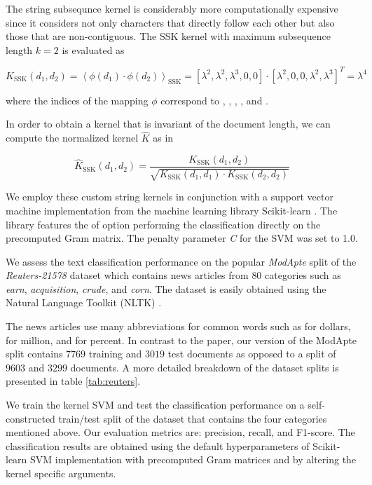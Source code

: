 
The string subsequnce kernel is considerably more computationally expensive since it considers not only characters that directly follow each other but also those that are non-contiguous. The SSK kernel with maximum subsequence length $k = 2$ is evaluated as

\begin{equation} \label{eq:ssk}
  K_\text{SSK}(d_1, d_2) = \left\langle \phi(d_1) \cdot \phi(d_2) \right\rangle_\text{SSK} = [\lambda^2, \lambda^2, \lambda^3, 0, 0] \cdot [\lambda^2, 0, 0, \lambda^2, \lambda^3]^T = \lambda^4
\end{equation}

where the indices of the mapping $\phi$ correspond to , , , , and .

In order to obtain a kernel that is invariant of the document length, we can compute the normalized kernel $\hat{K}$ as in

\begin{equation}
  \hat{K}_\text{SSK}(d_1, d_2) = \frac{K_\text{SSK}(d_1, d_2)}{\sqrt{K_\text{SSK}(d_1, d_1) \cdot K_\text{SSK}(d_2, d_2)}}
\end{equation}



We employ these custom string kernels in conjunction with a support vector machine implementation from the machine learning library Scikit-learn \cite{sklearn}. The library features the of option performing the classification directly on the precomputed Gram matrix. The penalty parameter \textit{C} for the SVM was set to 1.0. 

We assess the text classification performance on the popular \textit{ModApte} split of the \textit{Reuters-21578} dataset which contains news articles from $80$ categories such as \textit{earn}, \textit{acquisition}, \textit{crude}, and \textit{corn}. The dataset is easily obtained using the Natural Language Toolkit (NLTK) \cite{nltk}.

The news articles use many abbreviations for common words such as  for dollars,  for million, and  for percent. In contrast to the paper, our version of the ModApte split contains $7769$ training and $3019$ test documents as opposed to a split of $9603$ and $3299$ documents. A more detailed breakdown of the dataset splits is presented in table \ref{tab:reuters}.



We train the kernel SVM and test the classification performance on a self-constructed train/test split of the dataset that contains the four categories mentioned above. Our evaluation metrics are: precision, recall, and F1-score. The classification results are obtained using the default hyperparameters of Scikit-learn SVM implementation with precomputed Gram matrices and by altering the kernel specific arguments.

